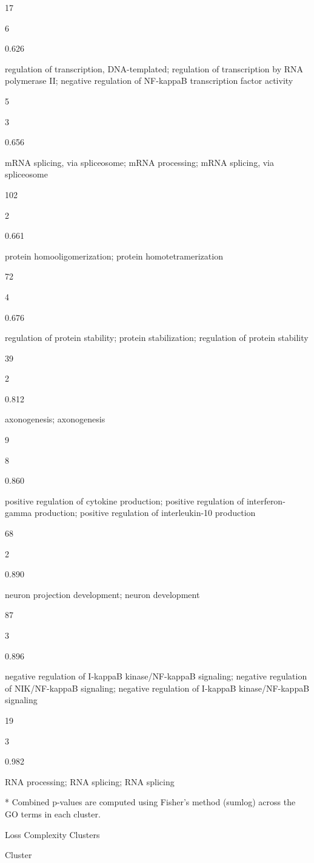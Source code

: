 \documentclass[
  letterpaper,
  DIV=11,
  numbers=noendperiod,
  openany,
  oneside]{scrreprt}
\begin{document}
17

6

0.626

regulation of transcription, DNA-templated; regulation of transcription
by RNA polymerase II; negative regulation of NF-kappaB transcription
factor activity

5

3

0.656

mRNA splicing, via spliceosome; mRNA processing; mRNA splicing, via
spliceosome

102

2

0.661

protein homooligomerization; protein homotetramerization

72

4

0.676

regulation of protein stability; protein stabilization; regulation of
protein stability

39

2

0.812

axonogenesis; axonogenesis

9

8

0.860

positive regulation of cytokine production; positive regulation of
interferon-gamma production; positive regulation of interleukin-10
production

68

2

0.890

neuron projection development; neuron development

87

3

0.896

negative regulation of I-kappaB kinase/NF-kappaB signaling; negative
regulation of NIK/NF-kappaB signaling; negative regulation of I-kappaB
kinase/NF-kappaB signaling

19

3

0.982

RNA processing; RNA splicing; RNA splicing

* Combined p-values are computed using Fisher's method (sumlog) across
the GO terms in each cluster.

Loss Complexity Clusters

Cluster
\end{document}
